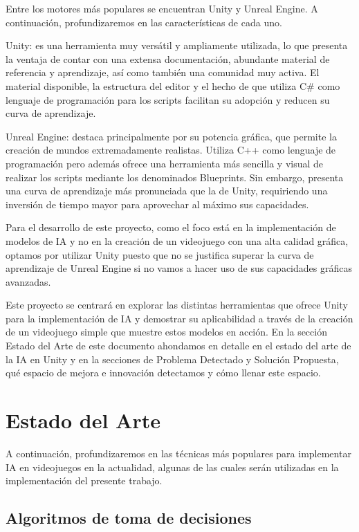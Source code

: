 \documentclass{article}
\begin{document}
Entre los motores más populares se encuentran Unity y Unreal Engine. A continuación, profundizaremos en las características de cada uno.

Unity: es una herramienta muy versátil y ampliamente utilizada, lo que presenta la ventaja de contar con una extensa documentación, abundante material de referencia y aprendizaje, así como también una comunidad muy activa. El material disponible, la estructura del editor y el hecho de que utiliza C\# como lenguaje de programación para los scripts facilitan su adopción y reducen su curva de aprendizaje.

Unreal Engine: destaca principalmente por su potencia gráfica, que permite la creación de mundos extremadamente realistas. Utiliza C++ como lenguaje de programación pero además ofrece una herramienta más sencilla y visual de realizar los scripts mediante los denominados Blueprints.
Sin embargo, presenta una curva de aprendizaje más pronunciada que la de Unity, requiriendo una inversión de tiempo mayor para aprovechar al máximo sus capacidades.

Para el desarrollo de este proyecto, como el foco está en la implementación de modelos de IA y no en la creación de un videojuego con una alta calidad gráfica, optamos por utilizar Unity puesto que no se justifica superar la curva de aprendizaje de Unreal Engine si no vamos a hacer uso de sus capacidades gráficas avanzadas.

Este proyecto se centrará en explorar las distintas herramientas que ofrece Unity para la implementación de IA y demostrar su aplicabilidad a través de la creación de un videojuego simple que muestre estos modelos en acción. En la sección Estado del Arte de este documento ahondamos en detalle en el estado del arte de la IA en Unity y en la secciones de Problema Detectado y Solución Propuesta, qué espacio de mejora e innovación detectamos y cómo llenar este espacio.

\section{Estado del Arte}
A continuación, profundizaremos en las técnicas más populares para implementar IA en videojuegos en la actualidad, algunas de las cuales serán utilizadas en la implementación del presente trabajo.

\subsection{Algoritmos de toma de decisiones}
\end{document}
